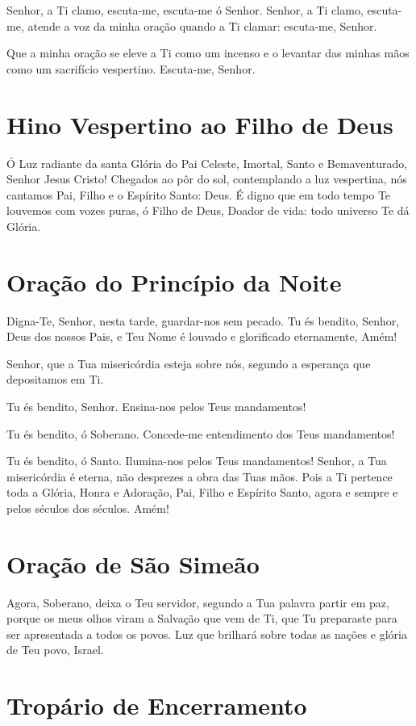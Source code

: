 \documentclass{subfiles}
\begin{document}
Senhor, a Ti clamo, escuta-me, escuta-me ó Senhor. Senhor, a Ti clamo,
escuta-me, atende a voz da minha oração quando a Ti clamar: escuta-me, Senhor.

Que a minha oração se eleve a Ti como um incenso e o levantar das minhas mãos
como um sacrifício vespertino. Escuta-me, Senhor.

\section*{Hino Vespertino ao Filho de Deus}

Ó Luz radiante da santa Glória do Pai Celeste, Imortal, Santo e Bemaventurado,
Senhor Jesus Cristo! Chegados ao pôr do sol, contemplando a luz vespertina, nós
cantamos Pai, Filho e o Espírito Santo: Deus. É digno que em todo tempo Te
louvemos com vozes puras, ó Filho de Deus, Doador de vida: todo universo Te dá
Glória.

\section*{Oração do Princípio da Noite}

Digna-Te, Senhor, nesta tarde, guardar-nos sem pecado. Tu és bendito,
Senhor, Deus dos nossos Pais, e Teu Nome é louvado e glorificado
eternamente, Amém!

Senhor, que a Tua misericórdia esteja sobre nós, segundo a esperança
que depositamos em Ti.

Tu és bendito, Senhor. Ensina-nos pelos Teus mandamentos!

Tu és bendito, ó Soberano. Concede-me entendimento dos Teus mandamentos!

Tu és bendito, ó Santo. Ilumina-nos pelos Teus mandamentos! Senhor, a Tua
misericórdia é eterna, não desprezes a obra das Tuas mãos. Pois a Ti pertence
toda a Glória, Honra e Adoração, Pai, Filho e Espírito Santo, agora e sempre e
pelos séculos dos séculos. Amém!

\section*{Oração de São Simeão}

Agora, Soberano, deixa o Teu servidor, segundo a Tua palavra partir em paz,
porque os meus olhos viram a Salvação que vem de Ti, que Tu preparaste para ser
apresentada a todos os povos. Luz que brilhará sobre todas as nações e glória de
Teu povo, Israel.

\section*{Tropário de Encerramento}
\end{document}
